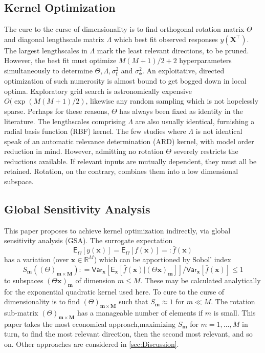 \documentclass[preprint,12pt]{elsarticle}
\newcommand*{\M}[1]{\ensuremath{#1}\xspace}
\newcommand*{\vr}[1]{\M{\mathbf{#1}}}
\newcommand*{\st}[1]{\M{\mathbb{#1}}}
\newcommand*{\deq}{\M{\mathrel{\mathop:}=}}
\newcommand*{\deqr}{\M{=\mathrel{\mathop:}}}
\newcommand*{\ev}[2][]{\mathsf{E}_{#1}\!\left\lbrack{} #2 \right\rbrack}
\newcommand*{\var}[2][]{\mathsf{Var}_{#1}\!\left\lbrack{} #2 \right\rbrack}
\begin{document}
        \subsection{Kernel Optimization}
            The cure to the curse of dimensionality is to find orthogonal rotation matrix $\Theta$ and diagonal lengthscale matrix $\Lambda$ which best fit observed responses $y(\vr{X}^{\intercal})$. The largest lengthscales in $\Lambda$ mark the least relevant directions, to be pruned. However, the best fit must optimize $M(M+1)/2+2$ hyperparameters simultaneously to determine $\Theta, \Lambda, \sigma^{2}_\vr{f}$ and $\sigma^{2}_\vr{e}$. An exploitative, directed optimization of such numerosity is almost bound to get bogged down in local optima. Exploratory grid search is astronomically expensive $O(\exp(M(M+1)/2)$, likewise any random sampling which is not hopelessly sparse. Perhaps for these reasons, $\Theta$ has always been fixed as identity in the literature. The lengthscales comprising $\Lambda$ are also usually identical, furnishing a radial basis function (RBF) kernel. The few studies where $\Lambda$ is not identical speak of an automatic relevance determination (ARD) kernel, with model order reduction in mind. However, admitting no rotation $\Theta$ severely restricts the reductions available. If relevant inputs are mutually dependent, they must all be retained. Rotation, on the contrary, combines them into a low dimensional subspace.

        \subsection{Global Sensitivity Analysis}
            This paper proposes to achieve kernel optimization indirectly, via global sensitivity analysis (GSA).
            The surrogate expectation
            \begin{equation*}
                \ev[\Omega]{y(\vr{x})} = \ev[\Omega]{f(\vr{x})} \deqr \bar{f}(\vr{x})
            \end{equation*}
            has a variation (over $\vr{x} \in \st{R}^{M}$) which can be apportioned by Sobol' index
            \begin{equation*}
                S_{\vr{m}}((\Theta)_{\vr{m}\times\vr{M}}) \deq \var[\vr{x}]{\ev[\vr{x}]{\bar{f}(\vr{x}) \vert (\Theta \vr{x})_{\vr{m}}}} / \var[\vr{x}]{\bar{f}(\vr{x})} \leq 1
            \end{equation*}
            to subspaces $(\Theta \vr{x})_{\vr{m}}$ of dimension $m\leq M$. These may be calculated analytically for the exponential quadratic kernel used here. To cure to the curse of dimensionality is to find $(\Theta)_{\vr{m}\times\vr{M}}$ such that $S_{\vr{m}} \approx 1$ for $m\ll M$. The rotation sub-matrix $(\Theta)_{\vr{m}\times\vr{M}}$ has a manageable number of elements if $m$ is small. This paper takes the most economical approach,maximizing $S_{\vr{m}}$ for $m=1,\ldots,M$ in turn, to find the most relevant direction, then the second most relevant, and so on. Other approaches are considered in \cref{sec:Discussion}.
\end{document}
